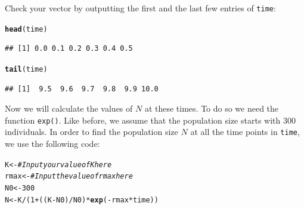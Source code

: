 \documentclass{article}\usepackage[]{graphicx}\usepackage[]{color}
\makeatletter
\newcommand{\hlnum}[1]{\textcolor[rgb]{0.686,0.059,0.569}{#1}}%
\newcommand{\hlcom}[1]{\textcolor[rgb]{0.678,0.584,0.686}{\textit{#1}}}%
\newcommand{\hlopt}[1]{\textcolor[rgb]{0,0,0}{#1}}%
\newcommand{\hlstd}[1]{\textcolor[rgb]{0.345,0.345,0.345}{#1}}%
\newcommand{\hlkwb}[1]{\textcolor[rgb]{0.69,0.353,0.396}{#1}}%
\newcommand{\hlkwd}[1]{\textcolor[rgb]{0.737,0.353,0.396}{\textbf{#1}}}%
\newenvironment{kframe}{%
 \def\at@end@of@kframe{}%
 \ifinner\ifhmode%
  \def\at@end@of@kframe{\end{minipage}}%
  \begin{minipage}{\columnwidth}%
 \fi\fi%
 \def\FrameCommand##1{\hskip\@totalleftmargin \hskip-\fboxsep
 \colorbox{shadecolor}{##1}\hskip-\fboxsep
     \hskip-\linewidth \hskip-\@totalleftmargin \hskip\columnwidth}%
 \MakeFramed {\advance\hsize-\width
   \@totalleftmargin\z@ \linewidth\hsize
   \@setminipage}}%
 {\par\unskip\endMakeFramed%
 \at@end@of@kframe}
\newenvironment{knitrout}{}{} %
\makeatother
\begin{document}
\noindent Check your vector by outputting the first and the last few entries of \texttt{time}:
\begin{knitrout}
\color{fgcolor}\begin{kframe}
\begin{alltt}
\hlkwd{head}\hlstd{(time)}
\end{alltt}
\begin{verbatim}
## [1] 0.0 0.1 0.2 0.3 0.4 0.5
\end{verbatim}
\begin{alltt}
\hlkwd{tail}\hlstd{(time)}
\end{alltt}
\begin{verbatim}
## [1]  9.5  9.6  9.7  9.8  9.9 10.0
\end{verbatim}
\end{kframe}
\end{knitrout}
Now we will calculate the values of $N$ at these times. To do so we need the function \texttt{exp()}. Like before, we assume that the population size starts with $300$ individuals. In order to find the population size $N$ at all the time points in \texttt{time}, we use the following code:
\begin{knitrout}
\color{fgcolor}\begin{kframe}
\begin{alltt}
\hlstd{K}\hlkwb{<-}     \hlcom{# Input your value of K here}
\hlstd{rmax}\hlkwb{<-}  \hlcom{# Input the value of rmax here}
\hlstd{N0}\hlkwb{<-}\hlnum{300}
\hlstd{N}\hlkwb{<-}\hlstd{K}\hlopt{/}\hlstd{(}\hlnum{1}\hlopt{+}\hlstd{((K}\hlopt{-}\hlstd{N0)}\hlopt{/}\hlstd{N0)}\hlopt{*}\hlkwd{exp}\hlstd{(}\hlopt{-}\hlstd{rmax}\hlopt{*}\hlstd{time))}
\end{alltt}
\end{kframe}
\end{knitrout}
\end{document}
